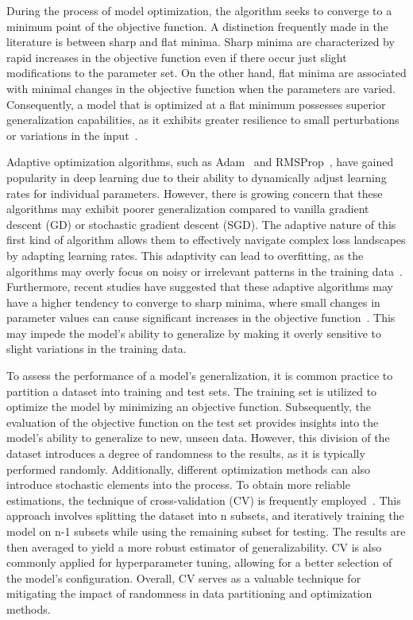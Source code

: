 \documentclass[10pt,conference,compsocconf]{IEEEtran}
\begin{document}
During the process of model optimization, the algorithm seeks to converge to a minimum point of the objective function. 
A distinction frequently made in the literature is between sharp and flat minima. 
Sharp minima are characterized by rapid increases in the objective function even if there occur just slight modifications to the parameter set. 
On the other hand, flat minima are associated with minimal changes in the objective function when the parameters are varied. 
Consequently, a model that is optimized at a flat minimum possesses superior generalization capabilities, as it exhibits greater resilience to small perturbations or variations in the input~\cite{keskar2017largebatch}.

Adaptive optimization algorithms, such as Adam~\cite{kingma2017adam} and RMSProp~\cite{tieleman2012lecture}, have gained popularity in deep learning due to their ability to dynamically adjust learning rates for individual parameters. 
However, there is growing concern that these algorithms may exhibit poorer generalization compared to vanilla gradient descent (GD) or stochastic gradient descent (SGD). 
The adaptive nature of this first kind of algorithm allows them to effectively navigate complex loss landscapes by adapting learning rates. 
This adaptivity can lead to overfitting, as the algorithms may overly focus on noisy or irrelevant patterns in the training data~\cite{wilson2018marginal}. 
Furthermore, recent studies have suggested that these adaptive algorithms may have a higher tendency to converge to sharp minima, where small changes in parameter values can cause significant increases in the objective function~\cite{keskar2017largebatch}. 
This may impede the model's ability to generalize by making it overly sensitive to slight variations in the training data.

To assess the performance of a model's generalization, it is common practice to partition a dataset into training and test sets. 
The training set is utilized to optimize the model by minimizing an objective function. 
Subsequently, the evaluation of the objective function on the test set provides insights into the model's ability to generalize to new, unseen data.
However, this division of the dataset introduces a degree of randomness to the results, as it is typically performed randomly. 
Additionally, different optimization methods can also introduce stochastic elements into the process.
To obtain more reliable estimations, the technique of cross-validation (CV) is frequently employed~\cite{elements_of_statistical_learning}. 
This approach involves splitting the dataset into n subsets, and iteratively training the model on n-1 subsets while using the remaining subset for testing. 
The results are then averaged to yield a more robust estimator of generalizability. 
CV is also commonly applied for hyperparameter tuning, allowing for a better selection of the model's configuration.
Overall, CV serves as a valuable technique for mitigating the impact of randomness in data partitioning and optimization methods.
\end{document}
